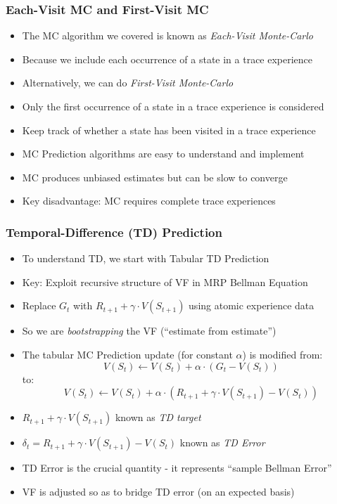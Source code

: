 \documentclass[handout]{beamer}
\begin{document}
\begin{frame}
\frametitle{Each-Visit MC and First-Visit MC}
\pause
\begin{itemize}[<+->]
\item The MC algorithm we covered is known as {\em Each-Visit Monte-Carlo}
\item Because we include each occurrence of a state in a trace experience
\item Alternatively, we can do {\em First-Visit Monte-Carlo}
\item  Only the first occurrence of a state in a trace experience is considered
\item  Keep track of whether a state has been visited in a trace experience
\item MC Prediction algorithms are easy to understand and implement
\item MC produces unbiased estimates but can be slow to converge
\item Key disadvantage: MC requires complete trace experiences
\end{itemize}
\end{frame}

\begin{frame}
\frametitle{Temporal-Difference (TD) Prediction}
\pause
\begin{itemize}[<+->]
\item To understand TD, we start with Tabular TD Prediction
\item Key: Exploit recursive structure of VF in MRP Bellman Equation
\item Replace $G_t$ with $R_{t+1} + \gamma \cdot V(S_{t+1})$ using atomic experience data
\item So we are {\em bootstrapping} the VF (``estimate from estimate'')
\item The tabular MC Prediction update (for constant $\alpha$) is modified from:
$$V(S_t) \leftarrow V(S_t) + \alpha \cdot (G_t - V(S_t))$$
to:
$$V(S_t) \leftarrow V(S_t) + \alpha \cdot (R_{t+1} + \gamma \cdot V(S_{t+1}) - V(S_t))$$
\item $R_{t+1} + \gamma \cdot V(S_{t+1})$ known as {\em TD target}
\item  $\delta_t = R_{t+1} + \gamma \cdot V(S_{t+1}) - V(S_t)$ known as  {\em TD Error}
\item TD Error is the crucial quantity - it represents ``sample Bellman Error''
\item VF is adjusted so as to bridge TD error (on an expected basis)
\end{itemize}
\end{frame}
\end{document}

